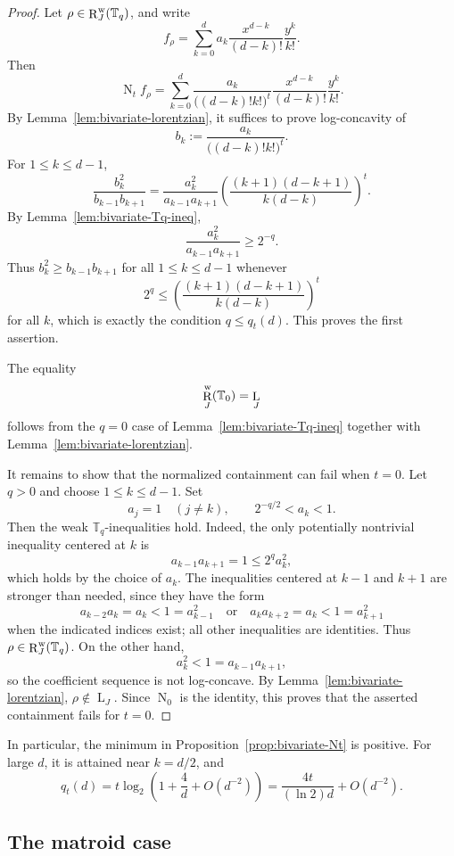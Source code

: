 \documentclass[12pt]{amsart}
\theoremstyle{definition}
\newcommand{\1}{\mathbf{1}}
\DeclareMathOperator{\upN}{N}   %
\DeclareMathOperator{\upL}{L}   %
\DeclareMathOperator{\upR}{R}   %
\newcommand\T{{\mathbb T}}
\begin{document}
\begin{proof}
Let $\rho\in \upR_J^{\rm w}(\T_q)$, and write
\[
f_\rho
=
\sum_{k=0}^d
a_k
\frac{x^{d-k}}{(d-k)!}\frac{y^k}{k!}.
\]
Then
\[
\upN_t f_\rho
=
\sum_{k=0}^d
\frac{a_k}{\bigl((d-k)!k!\bigr)^t}
\frac{x^{d-k}}{(d-k)!}\frac{y^k}{k!}.
\]
By Lemma~\ref{lem:bivariate-lorentzian}, it suffices to prove log-concavity of
\[
b_k:=\frac{a_k}{\bigl((d-k)!k!\bigr)^t}.
\]
For $1\le k\le d-1$,
\[
\frac{b_k^2}{b_{k-1}b_{k+1}}
=
\frac{a_k^2}{a_{k-1}a_{k+1}}
\left(
\frac{(k+1)(d-k+1)}{k(d-k)}
\right)^t.
\]
By Lemma~\ref{lem:bivariate-Tq-ineq},
\[
\frac{a_k^2}{a_{k-1}a_{k+1}}\ge 2^{-q}.
\]
Thus $b_k^2\ge b_{k-1}b_{k+1}$ for all $1\le k\le d-1$ whenever
\[
2^q\le
\left(
\frac{(k+1)(d-k+1)}{k(d-k)}
\right)^t
\]
for all $k$, which is exactly the condition $q\le q_t(d)$.  This proves the
first assertion.

The equality
\[
\upR_J^{\rm w}(\T_0)=\upL_J
\]
follows from the $q=0$ case of Lemma~\ref{lem:bivariate-Tq-ineq} together with
Lemma~\ref{lem:bivariate-lorentzian}.

It remains to show that the normalized containment can fail when $t=0$.  Let 
$q>0$ and choose $1\le k\le d-1$. Set
\[
a_j=1 \quad (j\ne k),
\qquad
2^{-q/2}<a_k<1.
\]
Then the weak $\T_q$-inequalities hold. Indeed, the only potentially nontrivial
inequality centered at $k$ is
\[
a_{k-1}a_{k+1}=1\le 2^q a_k^2,
\]
which holds by the choice of $a_k$.  The inequalities centered at $k-1$ and
$k+1$ are stronger than needed, since they have the form
\[
a_{k-2}a_k=a_k<1=a_{k-1}^2
\quad\text{or}\quad
a_ka_{k+2}=a_k<1=a_{k+1}^2
\]
when the indicated indices exist; all other inequalities are identities.
Thus $\rho\in \upR_J^{\rm w}(\T_q)$.  On the other hand,
\[
a_k^2<1=a_{k-1}a_{k+1},
\]
so the coefficient sequence is not log-concave.  By
Lemma~\ref{lem:bivariate-lorentzian}, $\rho\notin \upL_J$.  Since
$\upN_0$ is the identity, this proves that the asserted containment fails for
$t=0$.
\end{proof}



In particular, the minimum in Proposition~\ref{prop:bivariate-Nt} is positive.
For large $d$, it is attained near $k=d/2$, and
\[
q_t(d)
=
t\log_2\left(1+\frac4d+O(d^{-2})\right)
=
\frac{4t}{(\ln 2)d}+O(d^{-2}).
\]

\subsection{The matroid case}
\label{subsec:matroid-reduction}
\end{document}
